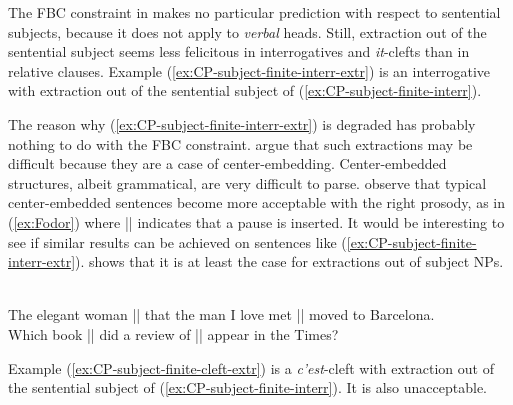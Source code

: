 The FBC constraint in  makes no particular prediction with respect to sentential subjects, because it does not apply to \emph{verbal} heads.
Still, extraction out of the sentential subject seems less felicitous in interrogatives and \emph{it}-clefts than in relative clauses. Example (\ref{ex:CP-subject-finite-interr-extr}) is an interrogative with extraction out of the sentential subject of (\ref{ex:CP-subject-finite-interr}). 

\eal
{}
 \label{ex:CP-subject-finite-interr}
\label{ex:CP-subject-finite-interr-extr}
\zl 

The reason why (\ref{ex:CP-subject-finite-interr-extr}) is degraded has probably nothing to do with the FBC constraint. \citet{Davies.2009} argue that such extractions may be difficult because they are a case of center-embedding. Center-embedded structures, albeit grammatical, are very difficult to parse. \citet{Fodor.2017} observe that typical center-embedded sentences become more acceptable with the right prosody, as in (\ref{ex:Fodor}) where || indicates that a pause is inserted. It would be interesting to see if similar results can be achieved on sentences like (\ref{ex:CP-subject-finite-interr-extr}). \citet{Chaves.2012} shows that it is at least the case for extractions out of subject NPs. 

\eal 
\ex \citep[ex.\ 11]{Fodor.2017}\\
The elegant woman || that the man I love met || moved to Barcelona.
\label{ex:Fodor}
\ex \citep[ex.\ 56a]{Chaves.2012}\\
Which book || did a review of || appear in the Times?
\zl 

Example (\ref{ex:CP-subject-finite-cleft-extr}) is a \emph{c'est}-cleft with extraction out of the sentential subject of (\ref{ex:CP-subject-finite-interr}). It is also unacceptable.

\label{ex:CP-subject-finite-cleft-extr}
\z  

